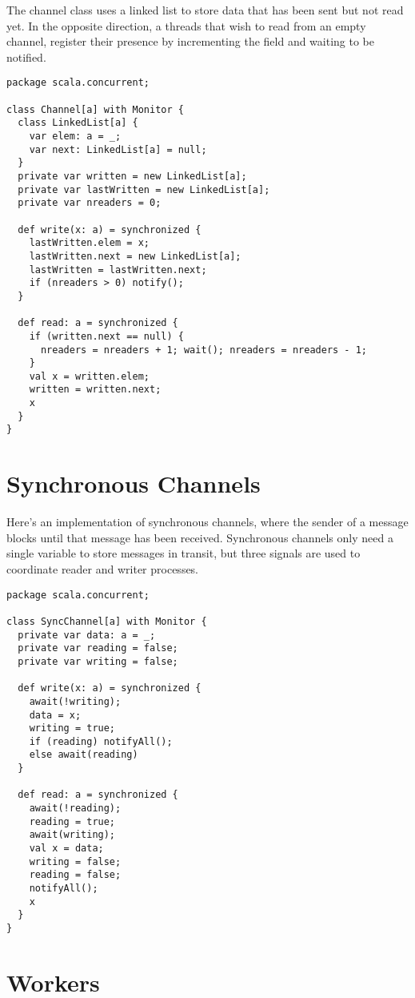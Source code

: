{The channel class uses a linked list to store data that has been sent
but not read yet. In the opposite direction, a threads that
wish to read from an empty channel, register their presence by
incrementing the  field and waiting to be notified.
\begin{lstlisting}
package scala.concurrent;

class Channel[a] with Monitor {
  class LinkedList[a] {
    var elem: a = _;
    var next: LinkedList[a] = null;
  }
  private var written = new LinkedList[a];
  private var lastWritten = new LinkedList[a];
  private var nreaders = 0;

  def write(x: a) = synchronized {
    lastWritten.elem = x;
    lastWritten.next = new LinkedList[a];
    lastWritten = lastWritten.next;
    if (nreaders > 0) notify();
  }

  def read: a = synchronized {
    if (written.next == null) {
      nreaders = nreaders + 1; wait(); nreaders = nreaders - 1;
    }
    val x = written.elem;
    written = written.next;
    x
  }
}
\end{lstlisting}

\section{Synchronous Channels}

Here's an implementation of synchronous channels, where the sender of
a message blocks until that message has been received. Synchronous
channels only need a single variable to store messages in transit, but
three signals are used to coordinate reader and writer processes.
\begin{lstlisting}
package scala.concurrent;

class SyncChannel[a] with Monitor {
  private var data: a = _;
  private var reading = false;
  private var writing = false;

  def write(x: a) = synchronized {
    await(!writing);
    data = x;
    writing = true;
    if (reading) notifyAll();
    else await(reading)
  }

  def read: a = synchronized {
    await(!reading);
    reading = true;
    await(writing);
    val x = data;
    writing = false;
    reading = false;
    notifyAll();
    x
  }
}
\end{lstlisting}

\section{Workers}

}

